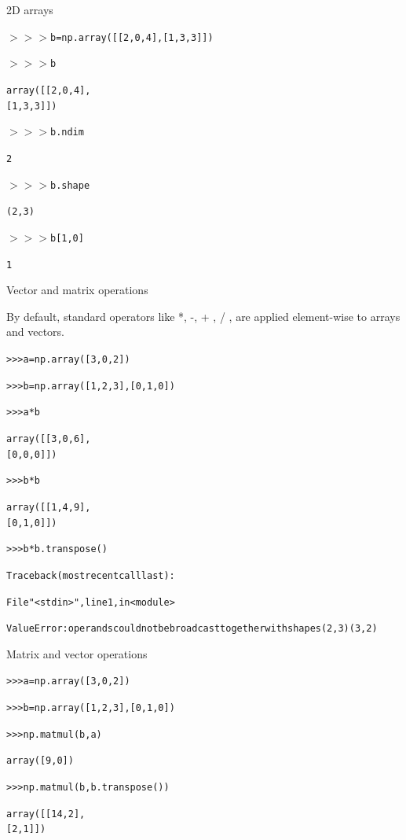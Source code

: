 \documentclass[xcolor=pdftex,dvipsnames,table,mathserif]{beamer}
\begin{document}
\begin{frame}{2D arrays}

\begin{block}{}
  \begin{alltt}
    $>>>$ b = np.array([[2, 0, 4], [1, 3, 3]])

    $>>>$ b

  array([[2, 0, 4],
    [1, 3, 3]])

  $>>>$ b.ndim

  2

  $>>>$ b.shape

  (2, 3)

  $>>>$ b[1, 0]

  1


  \end{alltt}
\end{block}


\end{frame}


\begin{frame}{Vector and matrix operations}

By default, standard operators like *, -, + , / , are applied element-wise to arrays and vectors.

  \begin{block}{}
    \begin{alltt}
      >>> a = np.array([3, 0, 2])

      >>> b = np.array([1, 2, 3], [0, 1, 0])

      >>> a*b

  array([[3, 0, 6],
       [0, 0, 0]])

  >>> b*b

  array([[1, 4, 9],
         [0, 1, 0]])

  >>> b* b.transpose()

  Traceback (most recent call last):

  File "<stdin>", line 1, in <module>

  ValueError: operands could not be broadcast together with shapes (2,3) (3,2)
  \end{alltt}
\end{block}

\end{frame}


\begin{frame}{Matrix and vector operations}

    \begin{block}{}
    \begin{alltt}
      >>> a = np.array([3, 0, 2])

      >>> b = np.array([1, 2, 3], [0, 1, 0])

      >>> np.matmul(b,a)

      array([9, 0])

      >>> np.matmul(b,b.transpose())

      array([[14,  2],
             [ 2,  1]])

  \end{alltt}
\end{block}

\end{frame}
\end{document}
